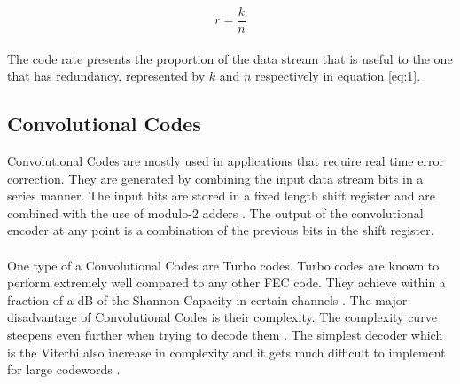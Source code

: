 \documentclass[11pt]{report}
\begin{document}
\begin{equation}
r = \frac{k}{n}
\label{eq:1}
\end{equation}{}
\\
The code rate presents the proportion of the data stream that is useful to the one that has redundancy, represented by $k$ and $n$ respectively in equation \ref{eq:1}.

\subsection{Convolutional Codes}
\label{sub:conv}
Convolutional Codes are mostly used in applications that require real time error correction. They are generated by combining the input data stream bits in a series manner. The input bits are stored in a fixed length shift register and are combined with the use of modulo-2 adders \cite{53}. The output of the convolutional encoder at any point is a combination of the previous bits in the shift register.
\\
\\
One type of a Convolutional Codes are Turbo codes. Turbo codes are known to perform extremely well compared to any other FEC code. They achieve within a fraction of a dB of the Shannon Capacity in certain channels \cite{B11}. The major disadvantage of Convolutional Codes is their complexity. The complexity curve steepens even further when trying to decode them \cite{B11}. The simplest decoder which is the Viterbi also increase in complexity and it gets much difficult to implement for large codewords
\cite{54}.
\end{document}
